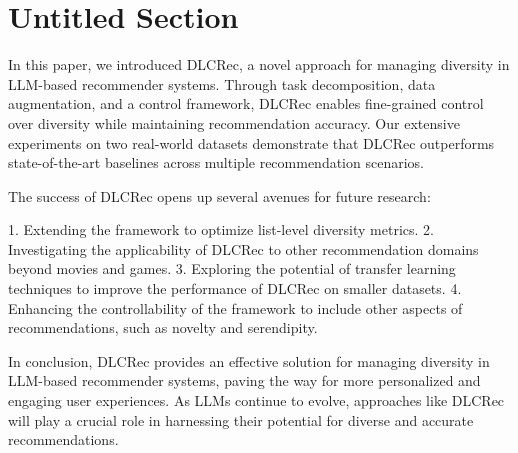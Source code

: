 \documentclass[10pt,twocolumn,letterpaper]{article}
\begin{document}
\section{Untitled Section}

In this paper, we introduced DLCRec, a novel approach for managing diversity in LLM-based recommender systems. Through task decomposition, data augmentation, and a control framework, DLCRec enables fine-grained control over diversity while maintaining recommendation accuracy. Our extensive experiments on two real-world datasets demonstrate that DLCRec outperforms state-of-the-art baselines across multiple recommendation scenarios.

The success of DLCRec opens up several avenues for future research:

1. Extending the framework to optimize list-level diversity metrics.
2. Investigating the applicability of DLCRec to other recommendation domains beyond movies and games.
3. Exploring the potential of transfer learning techniques to improve the performance of DLCRec on smaller datasets.
4. Enhancing the controllability of the framework to include other aspects of recommendations, such as novelty and serendipity.

In conclusion, DLCRec provides an effective solution for managing diversity in LLM-based recommender systems, paving the way for more personalized and engaging user experiences. As LLMs continue to evolve, approaches like DLCRec will play a crucial role in harnessing their potential for diverse and accurate recommendations.
\end{document}
